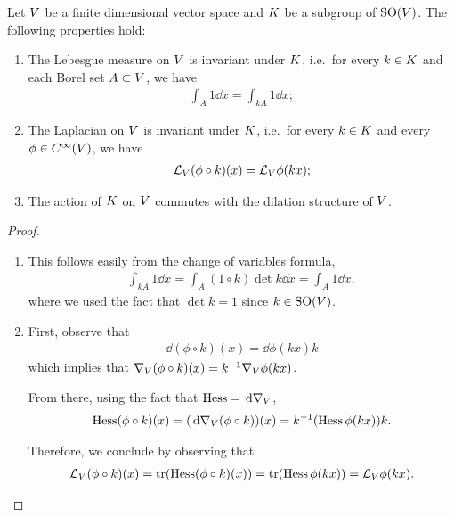 \begin{proposition}
    Let $\VectorSpace$ be a finite dimensional vector space
    and $\CompactGroup$ be a subgroup of $\SpecialOrthogonalGroup\VectorSpace$.
    The following properties hold:
    \begin{enumerate}
        \item The Lebesgue measure on $\VectorSpace$ is invariant under $\CompactGroup$,
            i.e.\ for every $k \in \CompactGroup$ and each Borel set $A \subset \VectorSpace$, we have
            \begin{align*}
                \int_A 1 \dd x = \int_{kA} 1 \dd x;
            \end{align*}
        \item The Laplacian on $\VectorSpace$ is invariant under $\CompactGroup$,
            i.e.\ for every $k \in \CompactGroup$ and every $\phi \in \SmoothFunctions\VectorSpace$, we have
            \begin{align*}
                \Laplacian[\VectorSpace] (\phi \circ k)(x) = \Laplacian[\VectorSpace] \phi(k x);
            \end{align*}
        \item The action of $\CompactGroup$ on $\VectorSpace$ commutes with the dilation structure of $\VectorSpace$.
    \end{enumerate}
\end{proposition}
\begin{proof}
    \begin{enumerate}
        \item This follows easily from the change of variables formula,
            \begin{align*}
                \int_{k A} 1 \dd x
                = \int_A (1 \circ k) \det k \dd x
                = \int_A 1 \dd x,
            \end{align*}
            where we used the fact that $\det k = 1$ since $k \in \SpecialOrthogonalGroup\VectorSpace$.
        \item First, observe that
            \begin{align*}
                \dd (\phi \circ k)(x) = \dd \phi(k x) k
            \end{align*}
            which implies that $\grad (\phi \circ k)(x) = k^{-1} \grad \phi(k x)$.

            From there, using the fact that $\Hessian = \dd \grad$,
            \begin{align*}
                \Hessian (\phi \circ k)(x) = (\dd \grad(\phi \circ k))(x) = k^{-1} (\Hessian \phi(k x)) k.
            \end{align*}

            Therefore, we conclude by observing that
            \begin{align*}
                \Laplacian[\VectorSpace] (\phi \circ k)(x)
                = \tr (\Hessian (\phi \circ k)(x))
                = \tr (\Hessian \phi (k x))
                = \Laplacian[\VectorSpace] \phi(k x).
            \end{align*}
    \end{enumerate}
\end{proof}

